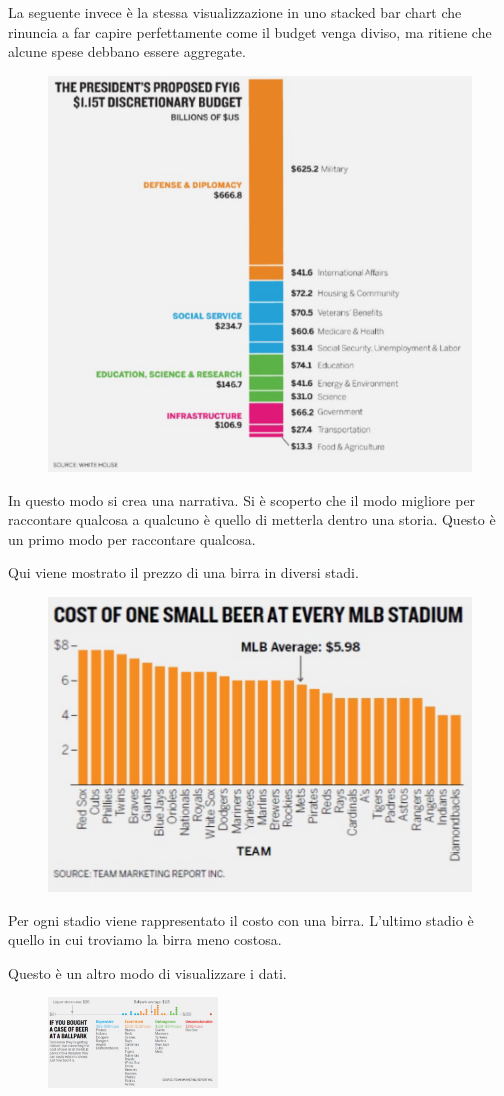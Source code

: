 \documentclass[12pt,a4paper]{report}
\begin{document}
La seguente invece è la stessa visualizzazione in uno stacked bar chart che rinuncia a far capire perfettamente come il budget venga diviso, ma ritiene che alcune spese debbano essere aggregate.

\begin{figure}[h]
	\centering
	\includegraphics[width=.48\textwidth]{imgs datavis/Budget.png}\hfil
	
	\caption{}\label{}
\end{figure}

 In questo modo si crea una narrativa. Si è scoperto che il modo migliore per raccontare qualcosa a qualcuno è quello di metterla dentro una storia. Questo è un primo modo per raccontare qualcosa.    

\newpage
Qui viene mostrato il prezzo di una birra in diversi stadi. 
\begin{figure}[h]
	\centering
	\includegraphics[width=.58\textwidth]{imgs datavis/prezzi birra.png}\hfil
	
	\caption{}\label{birra}
\end{figure}

Per ogni stadio viene rappresentato il costo con una birra. L'ultimo stadio è quello in cui troviamo la birra meno costosa. 

\newpage
Questo è un altro modo di visualizzare i dati. 
\begin{figure}[h]
	\centering
	\includegraphics[width=0.40\textwidth]{imgs datavis/prezzi birra 1.png}\hfil
	
	\caption{}\label{}
\end{figure}
\end{document}
